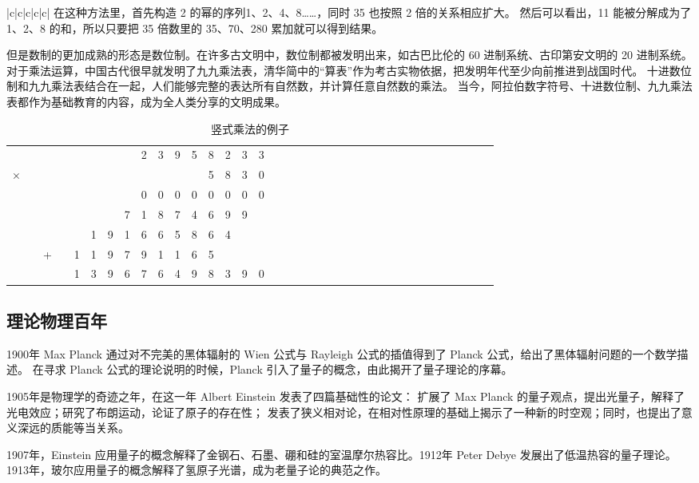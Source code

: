 \documentclass[a4paper,12pt]{article}
\begin{document}
\begin{table}[tbhp]
\begin{tabular}{|c|c|c|c|c|}
在这种方法里，首先构造 2 的幂的序列1、2、4、8……，同时 35 也按照 2 倍的关系相应扩大。
然后可以看出，11 能被分解成为了 1、2、8 的和，所以只要把 35 倍数里的 35、70、280 累加就可以得到结果。

但是数制的更加成熟的形态是数位制。在许多古文明中，数位制都被发明出来，如古巴比伦的 60 进制系统、古印第安文明的 20 进制系统。
对于乘法运算，中国古代很早就发明了九九乘法表，清华简中的“算表”作为考古实物依据，把发明年代至少向前推进到战国时代。
十进数位制和九九乘法表结合在一起，人们能够完整的表达所有自然数，并计算任意自然数的乘法。
当今，阿拉伯数字符号、十进数位制、九九乘法表都作为基础教育的内容，成为全人类分享的文明成果。

\begin{table}[tbhp]
\centering
\begin{tabular}{cccccccccccccccccccccccccccccccccccc}
  &   &   &   &   &   &   &   & 2 & 3 & 9 & 5 & 8 & 2 & 3 & 3\\
× &   &   &   &   &   &   &   &   &   &   &   & 5 & 8 & 3 & 0\\
\hline
  &   &   &   &   &   &   &   & 0 & 0 & 0 & 0 & 0 & 0 & 0 & 0\\
  &   &   &   &   &   &   & 7 & 1 & 8 & 7 & 4 & 6 & 9 & 9 &  \\
  &   &   &   &   & 1 & 9 & 1 & 6 & 6 & 5 & 8 & 6 & 4 &   &  \\
  &   & + &   & 1 & 1 & 9 & 7 & 9 & 1 & 1 & 6 & 5 &   &   &  \\
\hline
  &   &   &   & 1 & 3 & 9 & 6 & 7 & 6 & 4 & 9 & 8 & 3 & 9 & 0\\
\end{tabular}
\caption{竖式乘法的例子}
\end{table}

\subsection{理论物理百年}

1900年 Max Planck 通过对不完美的黑体辐射的 Wien 公式与 Rayleigh 公式的插值得到了 Planck 公式，给出了黑体辐射问题的一个数学描述。
在寻求 Planck 公式的理论说明的时候，Planck 引入了量子的概念，由此揭开了量子理论的序幕。

1905年是物理学的奇迹之年，在这一年 Albert Einstein 发表了四篇基础性的论文：
扩展了 Max Planck 的量子观点，提出光量子，解释了光电效应；研究了布朗运动，论证了原子的存在性；
发表了狭义相对论，在相对性原理的基础上揭示了一种新的时空观；同时，也提出了意义深远的质能等当关系。

1907年，Einstein 应用量子的概念解释了金钢石、石墨、硼和硅的室温摩尔热容比。1912年 Peter Debye 发展出了低温热容的量子理论。
1913年，玻尔应用量子的概念解释了氢原子光谱，成为老量子论的典范之作。


\end{tabular}
\end{table}
\end{document}
